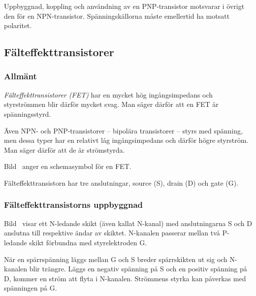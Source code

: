 Uppbyggnad, koppling och användning av en PNP-transistor motsvarar i övrigt den
för en NPN-transistor. Spänningskällorna måste emellertid ha motsatt polaritet.

\subsection{Fälteffekttransistorer}

\subsubsection{Allmänt}

\emph{Fälteffekttransistorer (FET)} har en mycket hög ingångsimpedans och
styrströmmen blir därför mycket svag.
Man säger därför att en FET är spänningsstyrd.

Även NPN- och PNP-transistorer -- bipolära transistorer -- styrs med spänning,
men dessa typer har en relativt låg ingångsimpedans och därför högre styrström.
Man säger därför att de är strömstyrda.



Bild~ anger en schemasymbol för en FET.

Fälteffekttransistorn har tre anslutningar, source (S), drain (D) och gate (G).


\subsubsection{Fälteffekttransistorns uppbyggnad}

Bild~ visar ett N-ledande skikt (även kallat N-kanal) med
anslutningarna S och D anslutna till respektive ändar av skiktet.
N-kanalen passerar mellan två P-ledande skikt förbundna med styrelektroden G.

När en spärrspänning läggs mellan G och S breder spärrskikten ut sig och
N-kanalen blir trängre.
Läggs en negativ spänning på S och en positiv spänning på D, kommer en ström att
flyta i N-kanalen.
Strömmens styrka kan påverkas med spänningen på G.

